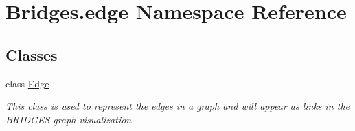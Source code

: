 \hypertarget{namespace_bridges_1_1edge}{}\section{Bridges.\+edge Namespace Reference}
\label{namespace_bridges_1_1edge}
\subsection*{Classes}
\begin{DoxyCompactItemize}
\item 
class \mbox{\hyperlink{class_bridges_1_1edge_1_1_edge}{Edge}}
\begin{DoxyCompactList}\small\item\em This class is used to represent the edges in a graph and will appear as links in the B\+R\+I\+D\+G\+ES graph visualization. \end{DoxyCompactList}\end{DoxyCompactItemize}
